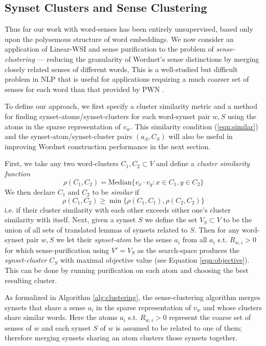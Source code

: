 \documentclass{book}
\begin{document}
\subsection{Synset Clusters and Sense Clustering}
\label{subsec:clustering}

Thus far our work with word-senses has been entirely unsupervised, based only upon the polysemous structure of word embeddings.
We now consider an application of Linear-WSI and sense purification to the problem of {\em sense-clustering} --- reducing the granularity of Wordnet's sense distinctions by merging closely related senses of different words, This is a well-studied but difficult problem in NLP that is useful for applications requiring a much coarser set of senses for each word than that provided by PWN \citep{Agirre:03,Snow:07}.

To define our approach, we first specify a cluster similarity metric and a method for finding synset-atoms/synset-clusters for each word-synset pair $w,S$ using the atoms in the sparse representation of $v_w$.
This similarity condition (\ref{eqn:similar}) and the synset-atom/synset-cluster pairs $(a_S,C_S)$ will also be useful in improving Wordnet construction performance in the next section.

First, we take any two word-clusters $C_1,C_2\subset V$ and define a {\em cluster similarity function}
$$\rho(C_1,C_2)=\textrm{Median}\{v_x\cdot v_y:x\in C_1,y\in C_2\}$$
We then declare $C_1$ and $C_2$ to be {\em similar} if 
\begin{equation}
\label{eqn:similar}
\rho(C_1,C_2)\ge\min\{\rho(C_1,C_1),\rho(C_2,C_2)\}
\end{equation}
i.e. if their cluster similarity with each other exceeds either one's cluster similarity with itself.
Next, given a synset $S$ we define the set $V_S\subset V$ to be the union of all sets of translated lemmas of synsets related to $S$.
Then for any word-synset pair $w,S$ we let their {\em synset-atom} be the sense $a_i$ from all $a_i$ s.t. $R_{w,i}>0$ for which sense-purification using $V'=V_S$ as the search-space produces the {\em synset-cluster} $C_S$ with maximal objective value (see Equation \ref{eqn:objective}).
This can be done by running purification on each atom and choosing the best resulting cluster.

As formalized in Algorithm \ref{alg:clustering}, the sense-clustering algorithm merges synsets that share a sense $a_i$ in the sparse representation of $v_w$ and whose clusters share similar words.
Here the atoms $a_i$ s.t. $R_{w,i}>0$ represent the coarse set of senses of $w$ and each synset $S$ of $w$ is assumed to be related to one of them;
therefore merging synsets sharing an atom clusters those synsets together.
\end{document}
